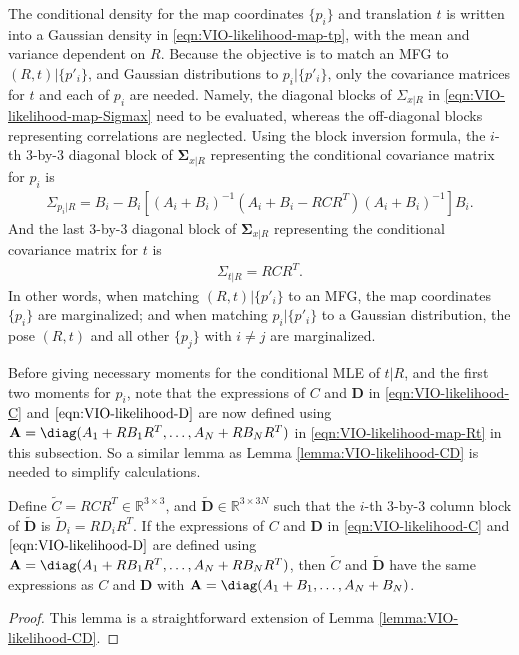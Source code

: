 The conditional density for the map coordinates $\{p_i\}$ and translation $t$ is written into a Gaussian density in \eqref{eqn:VIO-likelihood-map-tp}, with the mean and variance dependent on $R$.
Because the objective is to match an MFG to $(R,t)|\{p'_i\}$, and Gaussian distributions to $p_i|\{p'_i\}$, only the covariance matrices for $t$ and each of $p_i$ are needed.
Namely, the diagonal blocks of $\Sigma_{x|R}$ in \eqref{eqn:VIO-likelihood-map-Sigmax} need to be evaluated, whereas the off-diagonal blocks representing correlations are neglected.
Using the block inversion formula, the $i$-th 3-by-3 diagonal block of $\bm{\Sigma}_{x|R}$ representing the conditional covariance matrix for $p_i$ is
\begin{align}
	\Sigma_{p_i|R} = B_i - B_i \left[ (A_i+B_i)^{-1} (A_i+B_i - RCR^T) (A_i+B_i)^{-1} \right] B_i.
\end{align}
And the last 3-by-3 diagonal block of $\bm{\Sigma}_{x|R}$ representing the conditional covariance matrix for $t$ is
\begin{align}
	\Sigma_{t|R} = RCR^T.
\end{align}
In other words, when matching $(R,t)|\{p'_i\}$ to an MFG, the map coordinates $\{p_i\}$ are marginalized; and when matching $p_i|\{p'_i\}$ to a Gaussian distribution, the pose $(R,t)$ and all other $\{p_j\}$ with $i\neq j$ are marginalized.

Before giving necessary moments for the conditional MLE of $t|R$, and the first two moments for $p_i$, note that the expressions of $C$ and $\mathbf{D}$ in \eqref{eqn:VIO-likelihood-C} and $\eqref{eqn:VIO-likelihood-D}$ are now defined using $\mathbf{A} = \diag(A_1+RB_1R^T, \ldots, A_N+RB_NR^T)$ in \eqref{eqn:VIO-likelihood-map-Rt} in this subsection.
So a similar lemma as Lemma \ref{lemma:VIO-likelihood-CD} is needed to simplify calculations.

\begin{lemma}
	Define $\tilde{C} = RCR^T \in \mathbb{R}^{3\times 3}$, and $\tilde{\mathbf{D}} \in \mathbb{R}^{3\times 3N}$ such that the $i$-th 3-by-3 column block of $\tilde{\mathbf{D}}$ is $\tilde{D}_i = RD_iR^T$.
	If the expressions of $C$ and $\mathbf{D}$ in \eqref{eqn:VIO-likelihood-C} and $\eqref{eqn:VIO-likelihood-D}$ are defined using $\mathbf{A} = \diag(A_1+RB_1R^T, \ldots, A_N+RB_NR^T)$, then $\tilde{C}$ and $\tilde{\mathbf{D}}$ have the same expressions as $C$ and $\mathbf{D}$ with $\mathbf{A} = \diag(A_1+B_1,\ldots,A_N+B_N)$.
\end{lemma}
\begin{proof}
	This lemma is a straightforward extension of Lemma \ref{lemma:VIO-likelihood-CD}.
\end{proof}

